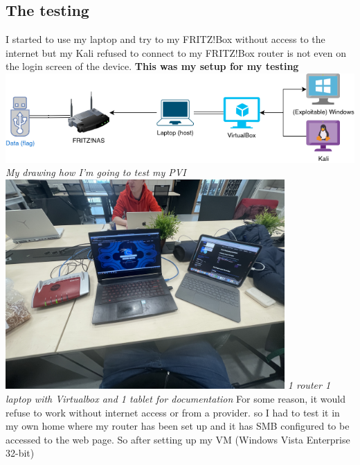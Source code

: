 \documentclass[12pt, letterpaper]{article}
\begin{document}
\subsection{The testing}
I started to use my laptop and try to my FRITZ!Box without access to the internet but my Kali refused to connect to my FRITZ!Box router is not even on the login screen of the device.
\newpage
\textbf{This was my setup for my testing}
\hfill\break
\includegraphics[width=1\textwidth]{fotos/PVI/PVI drawing.drawio.png}
\break
\emph{My drawing how I'm going to test my PVI}
\hfill\break
\hfill\break
\includegraphics[width=0.8\textwidth]{fotos/PVI/Demo fail.jpeg}
\break
\emph{1 router 1 laptop with Virtualbox and 1 tablet for documentation}
\hfill\break
\hfill\break
For some reason, it would refuse to work without internet access or from a provider. so I had to test it in my own home where my router has been set up and it has SMB configured to be accessed to the web page. So after setting up my VM (Windows Vista Enterprise 32-bit)
\end{document}
